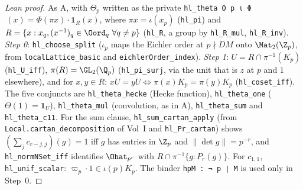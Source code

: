 \begin{proof}[Lean proof]
As A, with $\Theta_p$ written as the private \texttt{hl\_theta O p ι Φ}$\,(x)=\Phi(\pi x)\cdot\mathbf 1_R(x)$, where $\pi x=\iota(x_p)$ (\texttt{hl\_pi}) and $R=\{x:x_q,(x^{-1})_q\in\Oord_q\ \forall q\neq p\}$ (\texttt{hl\_R}, a group by \texttt{hl\_R\_mul}, \texttt{hl\_R\_inv}). \emph{Step 0}: \texttt{hl\_choose\_split} ($\iota_p$ maps the Eichler order at $p\nmid DM$ onto $\Mat_2(\Z_p)$, from \texttt{localLattice\_basic} and \texttt{eichlerOrder\_index}). \emph{Step 1}: $U=R\cap\pi^{-1}(K_p)$ (\texttt{hl\_U\_iff}), $\pi(R)=\GL_2(\Q_p)$ (\texttt{hl\_pi\_surj}, via the unit that is $z$ at $p$ and $1$ elsewhere), and for $x,y\in R$: $xU=yU\iff\pi(x)K_p=\pi(y)K_p$ (\texttt{hl\_coset\_iff}). The five conjuncts are \texttt{hl\_theta\_hecke} (Hecke function), \texttt{hl\_theta\_one} ($\Theta(1)=\mathbf 1_U$), \texttt{hl\_theta\_mul} (convolution, as in A), \texttt{hl\_theta\_sum} and \texttt{hl\_theta\_c11}. For the sum clause, \texttt{hl\_sum\_cartan\_apply} (from \texttt{Local.cartan\_decomposition} of Vol~I and \texttt{hl\_Pr\_cartan}) shows $(\sum_{j}c_{r-j,j})(g)=1$ iff $g$ has entries in $\Z_p$ and $\|\det g\|=p^{-r}$, and \texttt{hl\_normNSet\_iff} identifies $\Ohat_{p^r}$ with $R\cap\pi^{-1}\{g:P_r(g)\}$. For $c_{1,1}$, \texttt{hl\_unif\_scalar}: $\varpi_p\cdot1\in\iota(p)K_p$. The binder \texttt{hpM : ¬ p ∣ M} is used only in Step~0.
\end{proof}

